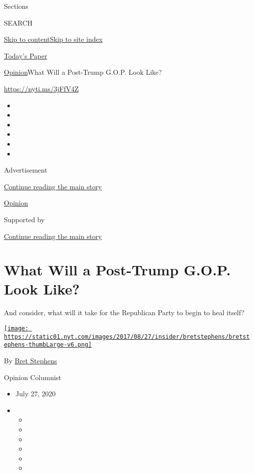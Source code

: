 Sections

SEARCH

\protect\hyperlink{site-content}{Skip to
content}\protect\hyperlink{site-index}{Skip to site index}

\href{https://myaccount.nytimes.com/auth/login?response_type=cookie\&client_id=vi}{}

\href{https://www.nytimes.com/section/todayspaper}{Today's Paper}

\href{/section/opinion}{Opinion}\textbar{}What Will a Post-Trump G.O.P.
Look Like?

\href{https://nyti.ms/3jFfV4Z}{https://nyti.ms/3jFfV4Z}

\begin{itemize}
\item
\item
\item
\item
\item
\item
\end{itemize}

Advertisement

\protect\hyperlink{after-top}{Continue reading the main story}

\href{/section/opinion}{Opinion}

Supported by

\protect\hyperlink{after-sponsor}{Continue reading the main story}

\hypertarget{what-will-a-post-trump-gop-look-like}{%
\section{What Will a Post-Trump G.O.P. Look
Like?}\label{what-will-a-post-trump-gop-look-like}}

And consider, what will it take for the Republican Party to begin to
heal itself?

\href{https://www.nytimes.com/by/bret-stephens}{\texttt{[image: https://static01.nyt.com/images/2017/08/27/insider/bretstephens/bretstephens-thumbLarge-v6.png]}}

By \href{https://www.nytimes.com/by/bret-stephens}{Bret Stephens}

Opinion Columnist

\begin{itemize}
\item
  July 27, 2020
\item
  \begin{itemize}
  \item
  \item
  \item
  \item
  \item
  \item
  \end{itemize}
\end{itemize}

